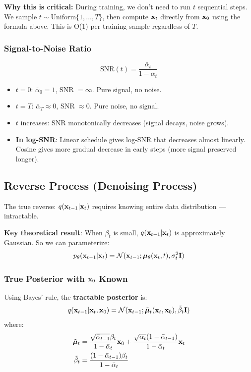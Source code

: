 \textbf{Why this is critical:} During training, we don't need to run $t$ sequential steps. We sample $t \sim \text{Uniform}\{1,\ldots,T\}$, then compute $\mathbf{x}_t$ directly from $\mathbf{x}_0$ using the formula above. This is O(1) per training sample regardless of $T$.

\subsubsection{Signal-to-Noise Ratio}
$$\text{SNR}(t) = \frac{\bar\alpha_t}{1-\bar\alpha_t}$$
\begin{itemize}
\item $t = 0$: $\bar\alpha_0 = 1$, SNR $= \infty$. Pure signal, no noise.
\item $t = T$: $\bar\alpha_T \approx 0$, SNR $\approx 0$. Pure noise, no signal.
\item $t$ increases: SNR monotonically decreases (signal decays, noise grows).
\item \textbf{In log-SNR}: Linear schedule gives log-SNR that decreases almost linearly. Cosine gives more gradual decrease in early steps (more signal preserved longer).
\end{itemize}

\subsection{Reverse Process (Denoising Process)}
The true reverse: $q(\mathbf{x}_{t-1}|\mathbf{x}_t)$ requires knowing entire data distribution — intractable.

\textbf{Key theoretical result}: When $\beta_t$ is small, $q(\mathbf{x}_{t-1}|\mathbf{x}_t)$ is approximately Gaussian. So we can parameterize:
\begin{equation}\label{eq:reverse}
p_\theta(\mathbf{x}_{t-1}|\mathbf{x}_t) = \mathcal{N}(\mathbf{x}_{t-1}; \boldsymbol{\mu}_\theta(\mathbf{x}_t, t), \sigma_t^2\mathbf{I})
\end{equation}

\subsubsection{True Posterior with $\mathbf{x}_0$ Known}
Using Bayes' rule, the \textbf{tractable posterior} is:
\begin{equation}
q(\mathbf{x}_{t-1}|\mathbf{x}_t, \mathbf{x}_0) = \mathcal{N}(\mathbf{x}_{t-1}; \tilde{\boldsymbol{\mu}}_t(\mathbf{x}_t, \mathbf{x}_0), \tilde\beta_t\mathbf{I})
\end{equation}
where:
\begin{align}
\tilde{\boldsymbol{\mu}}_t &= \frac{\sqrt{\bar\alpha_{t-1}}\beta_t}{1-\bar\alpha_t}\mathbf{x}_0 + \frac{\sqrt{\alpha_t}(1-\bar\alpha_{t-1})}{1-\bar\alpha_t}\mathbf{x}_t \label{eq:posterior_mean}\\
\tilde\beta_t &= \frac{(1-\bar\alpha_{t-1})\beta_t}{1-\bar\alpha_t} \label{eq:posterior_var}
\end{align}

